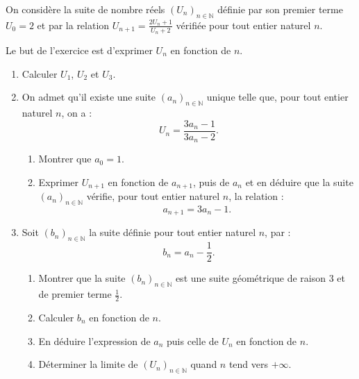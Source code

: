 \begin{exo}\label{exo:suite-7}
      On consid\`ere la suite de nombre r\'eels $(U_n)_{n\in\mathbb{N}}$ d\'efinie par 
      son premier terme $U_0 = 2$ et par la relation $U_{n+1} = \frac{2 U_n + 1}{U_n + 2}$
      v\'erifi\'ee pour tout entier naturel $n$.
      
      Le but de l'exercice est d'exprimer $U_n$ en fonction de $n$.
      \begin{enumerate}
            \item Calculer $U_1$, $U_2$ et $U_3$.
            \item On admet qu'il existe une suite $(a_n)_{n\in\mathbb{N}}$ unique telle que,
                  pour tout entier naturel $n$, on a : 
                        \[
                              U_n = \frac{3a_n-1}{3a_n-2}.
                        \]
                  \begin{enumerate}
                        \item Montrer que $a_0 = 1$.
                        \item Exprimer $U_{n+1}$ en fonction de $a_{n+1}$, 
                              puis de $a_n$ et en d\'eduire que la suite $(a_n)_{n\in\mathbb{N}}$ v\'erifie,
                              pour tout entier naturel $n$, la relation : 
                                    \[
                                          a_{n+1} = 3 a_n - 1.
                                    \]
                  \end{enumerate}
            \item Soit $(b_n)_{n\in\mathbb{N}}$ la suite d\'efinie pour tout entier naturel $n$, par :
                        \[
                              b_n = a_n - \frac{1}{2}.
                        \]
                  \begin{enumerate}
                        \item Montrer que la suite $(b_n)_{n\in\mathbb{N}}$ est une suite g\'eom\'etrique de 
                              raison 3 et de premier terme $\frac{1}{2}$.
                        \item Calculer $b_n$ en fonction de $n$.
                        \item En d\'eduire l'expression de $a_n$ puis celle de $U_n$ en fonction de $n$.
                        \item D\'eterminer la limite de $(U_n)_{n\in\mathbb{N}}$ quand $n$ tend vers $+\infty$.
                  \end{enumerate}
      \end{enumerate}
\end{exo}
